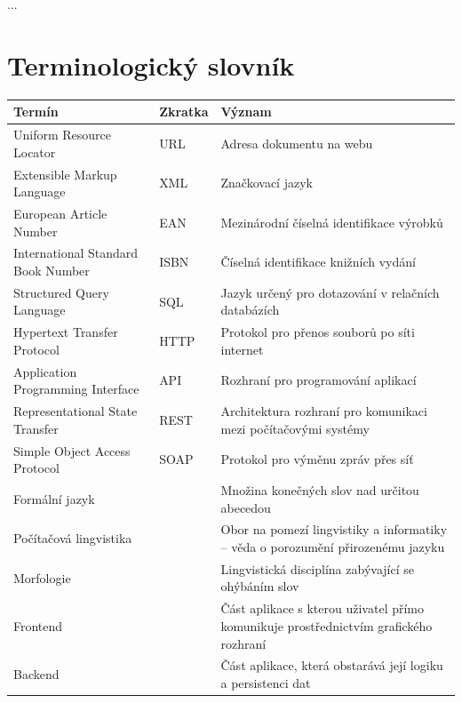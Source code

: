 \documentclass[FM,DP]{tulthesis}
\begin{document}
...


\appendix

\chapter{Terminologický slovník}

\begin{center}

\begin{tabular}{L{50mm} L{17mm} L{73mm}} 
\toprule
\textbf{Termín} & \textbf{Zkratka} & \textbf{Význam} \\
\midrule
Uniform Resource Locator & URL & Adresa dokumentu na webu\\
\hline
Extensible Markup Language & XML & Značkovací jazyk\\
\hline
European Article Number & EAN & Mezinárodní číselná identifikace výrobků\\
\hline
International Standard Book Number & ISBN & Číselná identifikace knižních vydání\\
\hline
Structured Query Language & SQL & Jazyk určený pro dotazování v relačních databázích\\
\hline
Hypertext Transfer Protocol & HTTP & Protokol pro přenos souborů po síti internet\\
\hline
Application Programming Interface & API & Rozhraní pro programování aplikací\\
\hline
Representational State Transfer & REST & Architektura rozhraní pro komunikaci mezi počítačovými systémy\\
\hline
Simple Object Access Protocol & SOAP & Protokol pro výměnu zpráv přes síť\\
\hline
Formální jazyk & & Množina konečných slov nad určitou abecedou\\
\hline
Počítačová lingvistika & & Obor na pomezí lingvistiky a informatiky -- věda o porozumění přirozenému jazyku\\
\hline
Morfologie & & Lingvistická disciplína zabývající se ohýbáním slov\\
\hline
Frontend & & Část aplikace s kterou uživatel přímo komunikuje prostřednictvím grafického rozhraní\\
\hline
Backend & & Část aplikace, která obstarává její logiku a persistenci dat\\
\bottomrule
\end{tabular}

\end{center}
\end{document}
